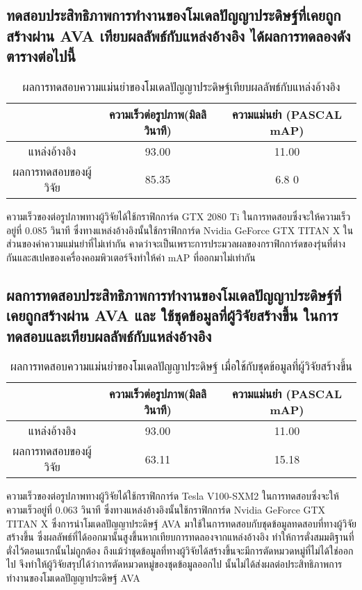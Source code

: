 \subsection{ทดสอบประสิทธิภาพการทำงานของโมเดลปัญญาประดิษฐ์ที่เคยถูกสร้างผ่าน AVA เทียบผลลัพธ์กับแหล่งอ้างอิง ได้ผลการทดลองดังตารางต่อไปนี้}
\begin{table}[!ht]
	\centering
	\begin{tabular}{|c|c|c|}
			\hline
			{}&{ความเร็วต่อรูปภาพ(มิลลิวินาที)}&{ความแม่นยำ (PASCAL mAP)}			\\
			\hline
			แหล่งอ้างอิง	 					& 93.00		& 11.00				\\
			ผลการทดสอบของผู้วิจัย				& 85.35  		& 6.8	0				\\
			\hline
	\end{tabular}
\caption{ผลการทดสอบความแม่นยำของโมเดลปัญญาประดิษฐ์เทียบผลลัพธ์กับแหล่งอ้างอิง}
\label{tab: Compare PASCAL mAP with source}
\end{table}
ความเร็วของต่อรูปภาพทางผู้วิจัยได้ใช้กราฟิกการ์ด GTX 2080 Ti ในการทดสอบซึ่งจะให้ความเร็วอยู่ที่ 0.085 วินาที ซึ่งทางแหล่งอ้างอิงนั้นใช้กราฟิกการ์ด Nvidia GeForce GTX TITAN X 
ในส่วนของค่าความแม่นยำที่ไม่เท่ากัน คาดว่าจะเป็นเพราะการประมวลผลของกราฟิกการ์ดของรุ่นที่ต่างกันและสเปคของเครื่องคอมพิวเตอร์จึงทำให้ค่า mAP ที่ออกมาไม่เท่ากัน

\subsection{ผลการทดสอบประสิทธิภาพการทำงานของโมเดลปัญญาประดิษฐ์ที่เคยถูกสร้างผ่าน AVA และ ใช้ชุดข้อมูลที่ผู้วิจัยสร้างขึ้น ในการทดสอบและเทียบผลลัพธ์กับแหล่งอ้างอิง}
\begin{table}[!ht]
	\centering
	\begin{tabular}{|c|c|c|}
			\hline
			{}&{ความเร็วต่อรูปภาพ(มิลลิวินาที)}&{ความแม่นยำ (PASCAL mAP)}			\\
			\hline
			แหล่งอ้างอิง	 					& 93.00			& 11.00			\\
			ผลการทดสอบของผู้วิจัย				& 63.11			& 15.18			\\
			\hline
	\end{tabular}
\caption{ผลการทดสอบความแม่นยำของโมเดลปัญญาประดิษฐ์ เมื่อใช้กับชุดข้อมูลที่ผู้วิจัยสร้างขึ้น}
\label{tab: Compare PASCAL mAP with dataset created by the researcher}
\end{table}
ความเร็วของต่อรูปภาพทางผู้วิจัยได้ใช้กราฟิกการ์ด Tesla V100-SXM2 ในการทดสอบซึ่งจะให้ความเร็วอยู่ที่ 0.063 วินาที ซึ่งทางแหล่งอ้างอิงนั้นใช้กราฟิกการ์ด Nvidia GeForce GTX TITAN X ซึ่งการนำโมเดลปัญญาประดิษฐ์ AVA มาใช้ในการทดสอบกับชุดข้อมูลทดสอบที่ทางผู้วิจัยสร้างขึ้น ซึ่งผลลัพธ์ที่ได้ออกมานั้นสูงขึ้นหากเทียบการทดลองจากแหล่งอ้างอิง ทำให้การตั่งสมมติฐานที่ตั่งไว้ตอนแรกนั้นไม่ถูกต้อง ถึงแม้ว่าชุดข้อมูลที่ทางผู้วิจัยได้สร้างขึ้นจะมีการตัดหมวดหมู่ที่ไม่ได้ใช่ออกไป จึงทำให้ผู้วิจัยสรุปได้ว่าการตัดหมวดหมู่ของชุดข้อมูลออกไป นั้นไม่ได้ส่งผลต่อประสิทธิภาพการทำงานของโมเดลปัญญาประดิษฐ์ AVA

